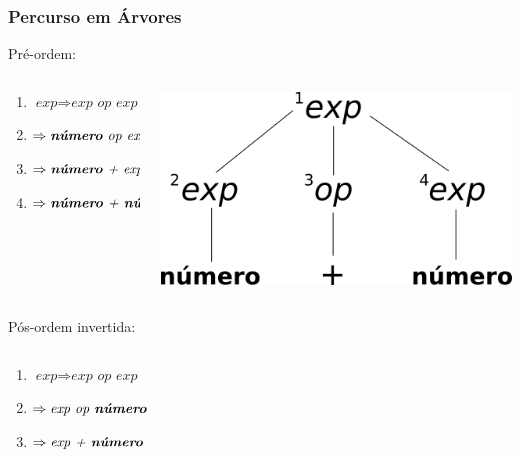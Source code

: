 \documentclass[table]{beamer}
\begin{document}
\begin{frame}
   \frametitle{Percurso em Árvores}
   Pré-ordem:
   \begin{columns}
   \begin{column}{0.5\textwidth}
   \begin{enumerate} 
      \item $\textit{exp} \Rightarrow \textit{exp op exp}$
      \item \hspace{0.5cm} $\Rightarrow \textit{\textbf{número} op exp}$
      \item \hspace{0.5cm} $\Rightarrow \textit{\textbf{número} + exp}$
      \item \hspace{0.5cm} $\Rightarrow \textit{\textbf{número} + \textbf{número}}$
   \end{enumerate}
   \end{column}
   \begin{column}{0.5\textwidth}
   \includegraphics[width=\linewidth,height=\textheight,keepaspectratio]{figuras/segunda_arvore.png}
   \end{column}
   \end{columns}
   \vspace{1.0cm}
   Pós-ordem invertida:
   \begin{columns}
   \begin{column}{0.5\textwidth}
   \begin{enumerate} 
      \item $\textit{exp} \Rightarrow \textit{exp op exp}$
      \item \hspace{0.5cm} $\Rightarrow \textit{exp op \textbf{número}}$
      \item \hspace{0.5cm} $\Rightarrow \textit{exp + \textbf{número}}$

\end{enumerate}
\end{column}
\end{columns}
\end{frame}
\end{document}
